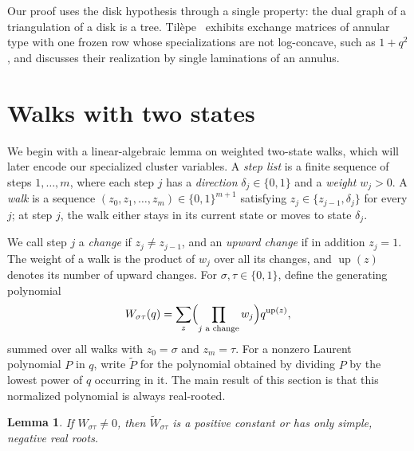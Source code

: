 \documentclass[11pt]{amsart}
\newtheorem{lemma}[theorem]{Lemma}
\theoremstyle{remark}
\numberwithin{equation}{section}
\newcommand{\up}{\operatorname{up}}
\begin{document}
Our proof uses the disk hypothesis through a single property: the dual graph of
a triangulation of a disk is a tree.
Til\`epe~\cite{Til} exhibits exchange matrices of annular type with one frozen
row whose specializations are not log-concave, such as $1+q^2$, and discusses
their realization by single laminations of an annulus.

\section{Walks with two states}\label{sec:walks}

We begin with a linear-algebraic lemma on weighted two-state walks, which will
later encode our specialized cluster variables. A \emph{step list} is a finite
sequence of steps $1,\dots,m$, where each step $j$ has a \emph{direction}
$\delta_j\in\{0,1\}$ and a \emph{weight} $w_j>0$. A \emph{walk} is a sequence
$(z_0,z_1,\dots,z_m)\in\{0,1\}^{m+1}$ satisfying $z_j\in\{z_{j-1},\delta_j\}$
for every $j$; at step $j$, the walk either stays in its current state or moves
to state $\delta_j$.

We call step $j$ a \emph{change} if $z_j\ne z_{j-1}$, and an \emph{upward
change} if in addition $z_j=1$. The weight of a walk is the product of $w_j$
over all its changes, and $\up(z)$ denotes its number of upward changes. For
$\sigma,\tau\in\{0,1\}$, define the generating polynomial
\[
W_{\sigma\tau}(q)=\sum_{z}\Bigl(\prod_{j\text{ a change}}w_j\Bigr)q^{\up(z)},
\]
summed over all walks with $z_0=\sigma$ and $z_m=\tau$. For a nonzero Laurent
polynomial $P$ in $q$, write $\widetilde P$ for the polynomial obtained by
dividing $P$ by the lowest power of $q$ occurring in it. The main result of
this section is that this normalized polynomial is always real-rooted.

\begin{lemma}\label{lem:walks}
If $W_{\sigma\tau}\ne0$, then $\widetilde W_{\sigma\tau}$ is a positive
constant or has only simple, negative real roots.
\end{lemma}
\end{document}
